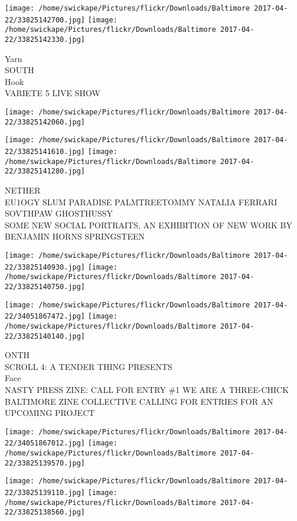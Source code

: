 \documentclass[10pt,letterpaper]{article}
\begin{document}
\texttt{[image: /home/swickape/Pictures/flickr/Downloads/Baltimore 2017-04-22/33825142700.jpg]}
\texttt{[image: /home/swickape/Pictures/flickr/Downloads/Baltimore 2017-04-22/33825142330.jpg]}

Yarn\\
SOUTH\\
Hook\\
VARIETE 5 LIVE SHOW
\pagebreak

\texttt{[image: /home/swickape/Pictures/flickr/Downloads/Baltimore 2017-04-22/33825142060.jpg]}

\vspace{0.25in}
\texttt{[image: /home/swickape/Pictures/flickr/Downloads/Baltimore 2017-04-22/33825141610.jpg]}
\texttt{[image: /home/swickape/Pictures/flickr/Downloads/Baltimore 2017-04-22/33825141280.jpg]}

NETHER\\
EU1OGY SLUM PARADISE PALMTREETOMMY NATALIA FERRARI SOVTHPAW GHOSTHUSSY\\
SOME NEW SOCIAL PORTRAITS, AN EXHIBITION OF NEW WORK BY BENJAMIN HORNS SPRINGSTEEN
\pagebreak

\texttt{[image: /home/swickape/Pictures/flickr/Downloads/Baltimore 2017-04-22/33825140930.jpg]}
\texttt{[image: /home/swickape/Pictures/flickr/Downloads/Baltimore 2017-04-22/33825140750.jpg]}

\texttt{[image: /home/swickape/Pictures/flickr/Downloads/Baltimore 2017-04-22/34051867472.jpg]}
\texttt{[image: /home/swickape/Pictures/flickr/Downloads/Baltimore 2017-04-22/33825140140.jpg]}

ONTH\\
SCROLL 4: A TENDER THING PRESENTS\\
Face\\
NASTY PRESS ZINE: CALL FOR ENTRY \#1 WE ARE A THREE{-}CHICK BALTIMORE ZINE COLLECTIVE CALLING FOR ENTRIES FOR AN UPCOMING PROJECT
\pagebreak

\texttt{[image: /home/swickape/Pictures/flickr/Downloads/Baltimore 2017-04-22/34051867012.jpg]}
\texttt{[image: /home/swickape/Pictures/flickr/Downloads/Baltimore 2017-04-22/33825139570.jpg]}

\texttt{[image: /home/swickape/Pictures/flickr/Downloads/Baltimore 2017-04-22/33825139110.jpg]}
\texttt{[image: /home/swickape/Pictures/flickr/Downloads/Baltimore 2017-04-22/33825138560.jpg]}
\end{document}

